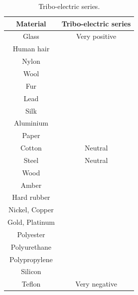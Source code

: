 \begin{minipage}{.6\textwidth}
\begin{center}
\begin{table}[H]
\centering
\begin{tabular}{|cc|}\hline
\textbf{Material}&\textbf{Tribo-electric series}\\\hline
Glass& Very positive\\\hline
Human hair&\\\hline
Nylon&\\\hline
Wool&\\\hline
Fur&\\\hline
Lead&\\\hline
Silk&\\\hline
Aluminium&\\\hline
Paper&\\\hline
Cotton&Neutral\\\hline
Steel &Neutral\\\hline
Wood&\\\hline
Amber&\\\hline
Hard rubber&\\\hline
Nickel, Copper&\\\hline
Gold, Platinum&\\\hline
Polyester&\\\hline
Polyurethane&\\\hline
Polypropylene&\\\hline
Silicon&\\\hline
Teflon& Very negative\\\hline
\end{tabular}
\caption{Tribo-electric series.}
\end{table}
\end{center}
\end{minipage}


    \label{m38780*cid6}
